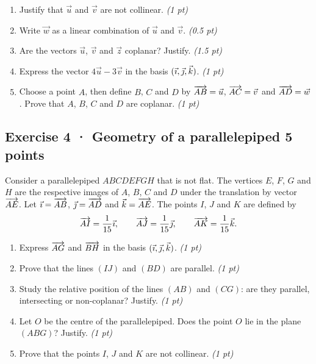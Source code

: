 \begin{enumerate}

\item Justify that $\vec u$ and $\vec v$ are not collinear. \hfill\textit{(1 pt)}

\item Write $\vec w$ as a linear combination of $\vec u$ and $\vec v$. \hfill\textit{(0.5 pt)}

\item Are the vectors $\vec u$, $\vec v$ and $\vec z$ coplanar? Justify. \hfill\textit{(1.5 pt)}

\item Express the vector $4\vec u-3\vec v$ in the basis $(\vec{\imath},\vec{\jmath},\vec k)$. \hfill\textit{(1 pt)}

\item Choose a point $A$, then define $B$, $C$ and $D$ by $\overrightarrow{AB}=\vec u$, $\overrightarrow{AC}=\vec v$ and $\overrightarrow{AD}=\vec w$. Prove that $A$, $B$, $C$ and $D$ are coplanar. \hfill\textit{(1 pt)}

\end{enumerate}

\subsection*{Exercise 4 · Geometry of a parallelepiped \hfill 5 points}Consider a parallelepiped $ABCDEFGH$ that is not flat. The vertices $E$, $F$, $G$ and $H$ are the respective images of $A$, $B$, $C$ and $D$ under the translation by vector $\overrightarrow{AE}$.
Let $\vec{\imath}=\overrightarrow{AB}$, $\vec{\jmath}=\overrightarrow{AD}$ and $\vec k=\overrightarrow{AE}$.
The points $I$, $J$ and $K$ are defined by
\[\overrightarrow{AI}=\frac1{15}\vec{\imath},\qquad\overrightarrow{AJ}=\frac1{15}\vec{\jmath},\qquad\overrightarrow{AK}=\frac1{15}\vec k.\]

\begin{enumerate}

\item Express $\overrightarrow{AG}$ and $\overrightarrow{BH}$ in the basis $(\vec{\imath},\vec{\jmath},\vec k)$. \hfill\textit{(1 pt)}

\item Prove that the lines $(IJ)$ and $(BD)$ are parallel. \hfill\textit{(1 pt)}

\item Study the relative position of the lines $(AB)$ and $(CG)$: are they parallel, intersecting or non-coplanar? Justify. \hfill\textit{(1 pt)}

\item Let $O$ be the centre of the parallelepiped. Does the point $O$ lie in the plane $(ABG)$? Justify. \hfill\textit{(1 pt)}

\item Prove that the points $I$, $J$ and $K$ are not collinear. \hfill\textit{(1 pt)}

\end{enumerate}

